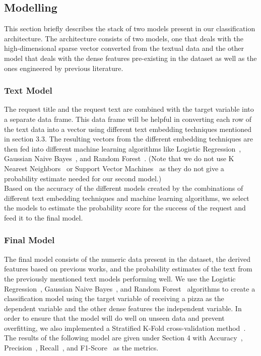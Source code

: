 \documentclass[conference]{IEEEtran}
\begin{document}
\subsection{Modelling}
This section briefly describes the stack of two models present in our classification architecture. The architecture consists of two models, one that deals with the high-dimensional sparse vector converted from the textual data and the other model that deals with the dense features pre-existing in the dataset as well as the ones engineered by previous literature.
\subsubsection{Text Model}
The request title and the request text are combined with the target variable into a separate data frame. This data frame will be helpful in converting each row of the text data into a vector using different text embedding techniques mentioned in section 3.3. The resulting vectors from the different embedding techniques are then fed into different machine learning algorithms like Logistic Regression~\cite{lr}, Gaussian Naive Bayes~\cite{nb}, and Random Forest~\cite{rf}. (Note that we do not use K Nearest Neighbors~\cite{knn} or Support Vector Machines~\cite{svm} as they do not give a probability estimate needed for our second model.)\\
Based on the accuracy of the different models created by the combinations of different text embedding techniques and machine learning algorithms, we select the models to estimate the probability score for the success of the request and feed it to the final model.
\subsubsection{Final Model}
The final model consists of the numeric data present in the dataset, the derived features based on previous works, and the probability estimates of the text from the previously mentioned text models performing well. We use the Logistic Regression~\cite{lr}, Gaussian Naive Bayes~\cite{nb}, and Random Forest~\cite{rf} algorithms to create a classification model using the target variable of receiving a pizza as the dependent variable and the other dense features the independent variable. In order to ensure that the model will do well on unseen data and prevent overfitting, we also implemented a Stratified K-Fold cross-validation method~\cite{strat_kfold}.\\
The results of the following model are given under Section 4 with Accuracy~\cite{metrics}, Precision~\cite{metrics}, Recall~\cite{metrics}, and F1-Score~\cite{metrics} as the metrics.
\end{document}
